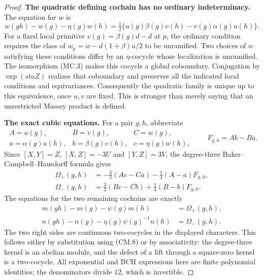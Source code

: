 \documentclass[11pt,a4paper]{article}
\theoremstyle{definition}
\renewcommand{\paragraph}[1]{\par\smallskip\noindent\textbf{#1}\quad\ignorespaces}
\begin{document}
\begin{proof}
\paragraph{The quadratic defining cochain has no ordinary indeterminacy.}
The equation for $w$ is
\[
 w(gh)-w(g)-\eta(g)w(h)
  =\tfrac12\{u(g)\beta(g)v(h)-v(g)\alpha(g)u(h)\}.         \tag{CM.8}
\]
For a fixed local primitive $v(g)=\beta(g)d-d$ at $p$,
the ordinary condition requires the class of
$w_p=w-d(1+\beta)u/2$ to be unramified.
Two choices of $w$ satisfying these conditions differ by an
$\eta$-cocycle whose localization is unramified.  The
isomorphism (MC.3) makes this cocycle a global coboundary.
Conjugation by $\exp(st aZ)$ realizes that coboundary and
preserves all the indicated local conditions and equivariances.
Consequently the quadratic family is unique up to this
equivalence, once $u,v$ are fixed.  This is stronger than
merely saying that an unrestricted Massey product is defined.

\paragraph{The exact cubic equations.}
For a pair $g,h$, abbreviate
\[
\begin{array}{lll}
 A=u(g),&B=v(g),&C=w(g),\\
 a=\alpha(g)u(h),&b=\beta(g)v(h),&c=\eta(g)w(h),
\end{array}
\qquad F_{g,h}=Ab-Ba.                                   \tag{CM.9}
\]
Since
$[X,Y]=Z$, $[X,Z]=-3U$ and $[Y,Z]=3V$, the degree-three
Baker--Campbell--Hausdorff formula gives
\[
\begin{split}
 \Omega_+(g,h)&=-\tfrac32(Ac-Ca)
                         -\tfrac14(A-a)F_{g,h},\\
 \Omega_-(g,h)&=\tfrac32(Bc-Cb)
                         +\tfrac14(B-b)F_{g,h}.
\end{split}                                                   \tag{CM.10}
\]
The equations for the two remaining cochains are exactly
\[
\begin{split}
 m(gh)-m(g)-\psi(g)m(h)&=\Omega_+(g,h),\\
 n(gh)-n(g)-\eta(g)\psi(g)^{-1}n(h)&=\Omega_-(g,h).
\end{split}                                                   \tag{CM.11}
\]
The two right sides are continuous two-cocycles in the displayed
characters.  This follows either by substitution using (CM.8)
or by associativity: the degree-three kernel is an abelian
module, and the defect of a lift through a square-zero kernel
is a two-cocycle.  All exponential and BCH expressions here
are finite polynomial identities; the denominators divide
$12$, which is invertible.


\end{proof}
\end{document}
